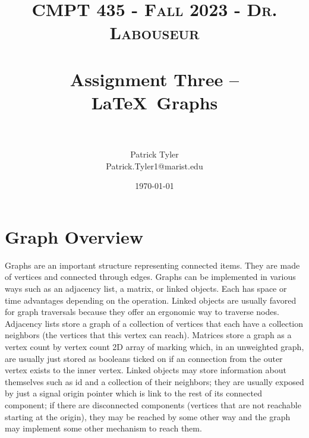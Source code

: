 \documentclass[letterpaper, 10pt]{article}
\title{	
   \normalfont \normalsize 
   \textsc{CMPT 435 - Fall 2023 - Dr. Labouseur} \\[10pt] %
   \horrule{0.5pt} \\[0.25cm] 	%
   \huge Assignment Three -- \LaTeX ~Graphs\\     	    %
   \horrule{0.5pt} \\[0.25cm] 	%
}
\author{Patrick Tyler \\ \normalsize Patrick.Tyler1@marist.edu}
\date{\normalsize\today} 	%
\begin{document}
\maketitle %
\section{Graph Overview}
Graphs are an important structure representing connected items. They are made of vertices and connected through
edges. Graphs can be implemented in various ways such as an adjacency list, a matrix, or linked objects.
Each has space or time advantages depending on the operation. Linked objects are usually favored for
graph traversals because they offer an ergonomic way to traverse nodes. Adjacency lists 
store a graph of a collection of vertices that each have a collection neighbors (the vertices that this vertex can reach).
Matrices store a graph
as a vertex count by vertex count 2D array of marking which, in an unweighted graph, are usually just stored as
booleans ticked on if an connection from the outer vertex exists to the inner vertex. Linked objects
may store information about themselves such as id and a collection of their neighbors; they 
are usually exposed by just a signal origin pointer which is link to the rest of its connected component; if
there are disconnected components (vertices that are not reachable starting at the origin), they may be
reached by some other way and the graph may implement some other mechanism to reach them.
\end{document}

